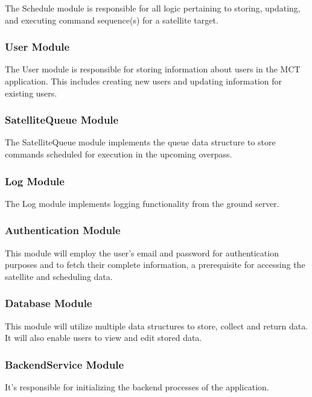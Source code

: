 \documentclass[12pt, titlepage]{article}
\begin{document}
The Schedule module is responsible for all logic pertaining to storing, updating, and executing command sequence(s) for a satellite target.

\subsubsection{User Module}

The User module is responsible for storing information about users in the MCT application. This includes creating new users and updating information for existing users.

\subsubsection{SatelliteQueue Module}

The SatelliteQueue module implements the queue data structure to store commands scheduled for execution in the upcoming overpass.

\subsubsection{Log Module}

The Log module implements logging functionality from the ground server.

\subsubsection{Authentication Module}

This module will employ the user's email and password for authentication purposes and to fetch their complete information, a prerequisite for accessing the satellite and scheduling data.

\subsubsection{Database Module}

This module will utilize multiple data structures to store, collect and return data. It will also enable users to view and edit stored data.

\subsubsection{BackendService Module}

It's responsible for initializing the backend processes of the application.  
 
\end{document}
